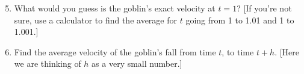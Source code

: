 \documentclass[12pt,letterpaper]{article}
\newcommand{\SetProbNumber}[1]{
  \int_gset:Nn \g__tasks_int {#1 + 1}
}
\begin{document}
	
	\begin{enumerate}%
	\setcounter{enumi}{4}
	\item What would you guess is the goblin's exact velocity at $t=1$? [If you're not sure, use a calculator to find the average for $t$ going from 1 to 1.01 and 1 to 1.001.]
	\vfill
	
	\item Find the average velocity of the goblin's fall from time $t$, to time $t+h$. [Here we are thinking of $h$ as a very small number.]
  \vfill	
	


\end{enumerate}
\end{document}
